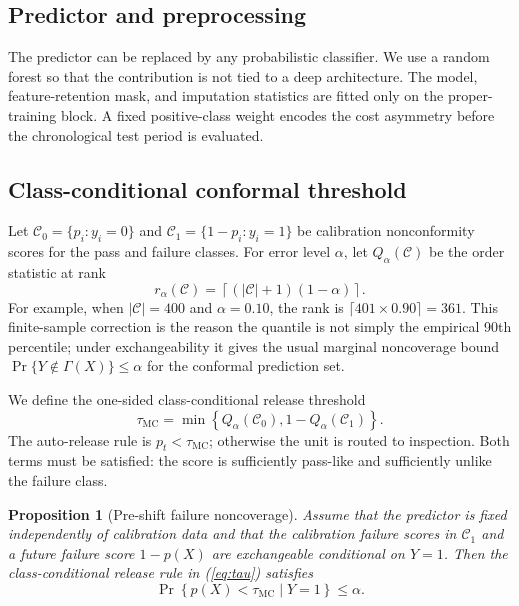\documentclass[journal]{IEEEtran}
\newtheorem{proposition}{Proposition}
\begin{document}
\subsection{Predictor and preprocessing}
The predictor can be replaced by any probabilistic classifier. We use a random forest so that the contribution is not tied to a deep architecture. The model, feature-retention mask, and imputation statistics are fitted only on the proper-training block. A fixed positive-class weight encodes the cost asymmetry before the chronological test period is evaluated.

\subsection{Class-conditional conformal threshold}
Let $\mathcal{C}_0=\{p_i:y_i=0\}$ and $\mathcal{C}_1=\{1-p_i:y_i=1\}$ be calibration nonconformity scores for the pass and failure classes. For error level $\alpha$, let $Q_\alpha(\mathcal{C})$ be the order statistic at rank
\[
 r_\alpha(\mathcal{C})=\left\lceil(|\mathcal{C}|+1)(1-\alpha)\right\rceil.
\]
For example, when $|\mathcal{C}|=400$ and $\alpha=0.10$, the rank is $\lceil401\times0.90\rceil=361$. This finite-sample correction is the reason the quantile is not simply the empirical 90th percentile; under exchangeability it gives the usual marginal noncoverage bound $\Pr\{Y\notin\Gamma(X)\}\leq\alpha$ for the conformal prediction set.

We define the one-sided class-conditional release threshold
\begin{equation}
\tau_{\mathrm{MC}}=\min\left\{Q_\alpha(\mathcal{C}_0),1-Q_\alpha(\mathcal{C}_1)\right\}.
\label{eq:tau}
\end{equation}
The auto-release rule is $p_t<\tau_{\mathrm{MC}}$; otherwise the unit is routed to inspection. Both terms must be satisfied: the score is sufficiently pass-like and sufficiently unlike the failure class.

\begin{proposition}[Pre-shift failure noncoverage]
\label{prop:pre-shift}
Assume that the predictor is fixed independently of calibration data and that the calibration failure scores in $\mathcal{C}_1$ and a future failure score $1-p(X)$ are exchangeable conditional on $Y=1$. Then the class-conditional release rule in (\ref{eq:tau}) satisfies
\begin{equation}
\Pr\left\{p(X)<\tau_{\mathrm{MC}}\mid Y=1\right\}\leq\alpha.
\label{eq:prop}
\end{equation}
\end{proposition}
\end{document}
